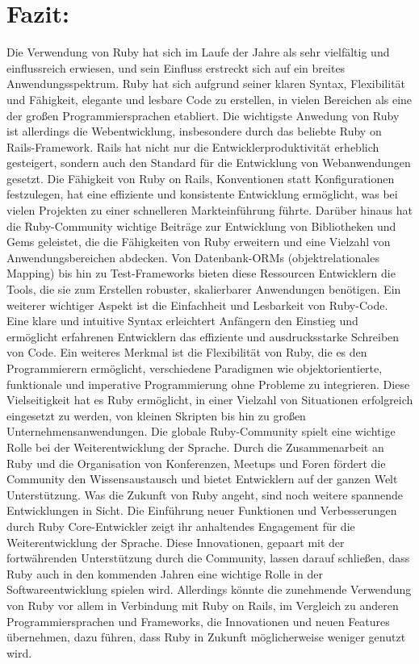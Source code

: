 \documentclass{article}
\begin{document}
\section*{Fazit:}
Die Verwendung von Ruby hat sich im Laufe der Jahre als sehr vielfältig und einflussreich erwiesen, und sein Einfluss erstreckt sich auf ein breites Anwendungsspektrum.
Ruby hat sich aufgrund seiner klaren Syntax, Flexibilität und Fähigkeit, elegante und lesbare Code zu erstellen, in vielen Bereichen als eine der großen Programmiersprachen etabliert.
Die wichtigste Anwedung von Ruby ist allerdings die Webentwicklung, insbesondere durch das beliebte Ruby on Rails-Framework.
Rails hat nicht nur die Entwicklerproduktivität erheblich gesteigert, sondern auch den Standard für die Entwicklung von Webanwendungen gesetzt.
Die Fähigkeit von Ruby on Rails, Konventionen statt Konfigurationen festzulegen, hat eine effiziente und konsistente Entwicklung ermöglicht, was bei vielen Projekten zu einer schnelleren Markteinführung führte.
Darüber hinaus hat die Ruby-Community wichtige Beiträge zur Entwicklung von Bibliotheken und Gems geleistet, die die Fähigkeiten von Ruby erweitern und eine Vielzahl von Anwendungsbereichen abdecken.
Von Datenbank-ORMs (objektrelationales Mapping) bis hin zu Test-Frameworks bieten diese Ressourcen Entwicklern die Tools, die sie zum Erstellen robuster, skalierbarer Anwendungen benötigen.
Ein weiterer wichtiger Aspekt ist die Einfachheit und Lesbarkeit von Ruby-Code.
Eine klare und intuitive Syntax erleichtert Anfängern den Einstieg und ermöglicht erfahrenen Entwicklern das effiziente und ausdrucksstarke Schreiben von Code.
Ein weiteres Merkmal ist die Flexibilität von Ruby, die es den Programmierern ermöglicht, verschiedene Paradigmen wie objektorientierte, funktionale und imperative Programmierung ohne Probleme zu integrieren.
Diese Vielseitigkeit hat es Ruby ermöglicht, in einer Vielzahl von Situationen erfolgreich eingesetzt zu werden, von kleinen Skripten bis hin zu großen Unternehmensanwendungen.
Die globale Ruby-Community spielt eine wichtige Rolle bei der Weiterentwicklung der Sprache.
Durch die Zusammenarbeit an Ruby und die Organisation von Konferenzen, Meetups und Foren fördert die Community den Wissensaustausch und bietet Entwicklern auf der ganzen Welt Unterstützung.
Was die Zukunft von Ruby angeht, sind noch weitere spannende Entwicklungen in Sicht.
Die Einführung neuer Funktionen und Verbesserungen durch Ruby Core-Entwickler zeigt ihr anhaltendes Engagement für die Weiterentwicklung der Sprache.
Diese Innovationen, gepaart mit der fortwährenden Unterstützung durch die Community, lassen darauf schließen, dass Ruby auch in den kommenden Jahren eine wichtige Rolle in der Softwareentwicklung spielen wird. Allerdings könnte die zunehmende Verwendung von Ruby vor allem in Verbindung mit Ruby on Rails, im Vergleich zu anderen Programmiersprachen und Frameworks, die Innovationen und neuen Features übernehmen, dazu führen, dass Ruby in Zukunft möglicherweise weniger genutzt wird.
\end{document}
